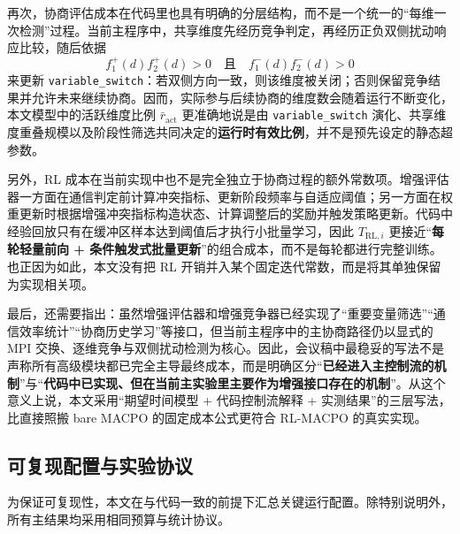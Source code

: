 \documentclass[12pt]{ctexart}
\begin{document}
再次，协商评估成本在代码里也具有明确的分层结构，而不是一个统一的“每维一次检测”过程。当前主程序中，共享维度先经历竞争判定，再经历正负双侧扰动响应比较，随后依据
\[
f_{1}^{+}(d)f_{2}^{+}(d)>0\quad\text{且}\quad f_{1}^{-}(d)f_{2}^{-}(d)>0
\]
来更新 \texttt{variable\_switch}：若双侧方向一致，则该维度被关闭；否则保留竞争结果并允许未来继续协商。因而，实际参与后续协商的维度数会随着运行不断变化，本文模型中的活跃维度比例 $\bar r_{\mathrm{act}}$ 更准确地说是由 \texttt{variable\_switch} 演化、共享维度重叠规模以及阶段性筛选共同决定的\textbf{运行时有效比例}，并不是预先设定的静态超参数。

另外，RL 成本在当前实现中也不是完全独立于协商过程的额外常数项。增强评估器一方面在通信判定前计算冲突指标、更新阶段频率与自适应阈值；另一方面在权重更新时根据增强冲突指标构造状态、计算调整后的奖励并触发策略更新。代码中经验回放只有在缓冲区样本达到阈值后才执行小批量学习，因此 $T_{\mathrm{RL},i}$ 更接近“\textbf{每轮轻量前向 + 条件触发式批量更新}”的组合成本，而不是每轮都进行完整训练。也正因为如此，本文没有把 RL 开销并入某个固定迭代常数，而是将其单独保留为实现相关项。

最后，还需要指出：虽然增强评估器和增强竞争器已经实现了“重要变量筛选”“通信效率统计”“协商历史学习”等接口，但当前主程序中的主协商路径仍以显式的 MPI 交换、逐维竞争与双侧扰动检测为核心。因此，会议稿中最稳妥的写法不是声称所有高级模块都已完全主导最终成本，而是明确区分“\textbf{已经进入主控制流的机制}”与“\textbf{代码中已实现、但在当前主实验里主要作为增强接口存在的机制}”。从这个意义上说，本文采用“期望时间模型 + 代码控制流解释 + 实测结果”的三层写法，比直接照搬 bare MACPO 的固定成本公式更符合 RL-MACPO 的真实实现。

\subsection{可复现配置与实验协议}

为保证可复现性，本文在与代码一致的前提下汇总关键运行配置。除特别说明外，所有主结果均采用相同预算与统计协议。
\end{document}
